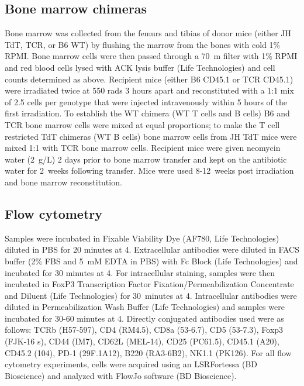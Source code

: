 \subsection{Bone marrow chimeras}

Bone marrow was collected from the femurs and tibias of donor mice (either JH\KO{} TdT\KO{}, TCR\textbeta{}\KO{}, or B6 WT) by flushing the marrow from the bones with cold 1\% RPMI. Bone marrow cells were then passed through a 70~\textmu{}m filter with 1\% RPMI and red blood cells lysed with ACK lysis buffer (Life Technologies) and cell counts determined as above. Recipient mice (either B6 CD45.1\pos{} or TCR\textbeta{}\KO{} CD45.1\pos{}) were irradiated twice at 550 rads 3 hours apart and reconstituted with a 1:1 mix of 2.5 cells per genotype that were injected intravenously within 5 hours of the first irradiation. To establish the WT chimera (WT T cells and B cells) B6 and TCR\textbeta{}\KO{} bone marrow cells were mixed at equal proportions; to make the T cell restricted TdT\KO{} chimeras (WT B cells) bone marrow cells from JH\KO{} TdT\KO{} mice were mixed 1:1 with TCR\textbeta{}\KO{} bone marrow cells. Recipient mice were given neomycin water (2~g/L) 2 days prior to bone marrow transfer and kept on the antibiotic water for 2~weeks following transfer. Mice were used 8-12~weeks post irradiation and bone marrow reconstitution.

\subsection{Flow cytometry}

Samples were incubated in Fixable Viability Dye (AF780, Life Technologies) diluted in PBS for 20 minutes at 4. Extracellular antibodies were diluted in FACS buffer (2\% FBS and 5~mM EDTA in PBS) with Fc Block (Life Technologies) and incubated for 30 minutes at 4. For intracellular staining, samples were then incubated in FoxP3 Transcription Factor Fixation/Permeabilization Concentrate and Diluent (Life Technologies) for 30~minutes at 4. Intracellular antibodies were diluted in Permeabilization Wash Buffer (Life Technologies) and samples were incubated for 30-60 minutes at 4. Directly conjugated antibodies used were as follows: TCRb (H57-597), CD4 (RM4.5), CD8a (53-6.7), CD5 (53-7.3), Foxp3 (FJK-16 s), CD44 (IM7), CD62L (MEL-14), CD25 (PC61.5), CD45.1 (A20), CD45.2 (104), PD-1 (29F.1A12), B220 (RA3-6B2), NK1.1 (PK126). For all flow cytometry experiments, cells were acquired using an LSRFortessa (BD Bioscience) and analyzed with FlowJo software (BD Bioscience).

